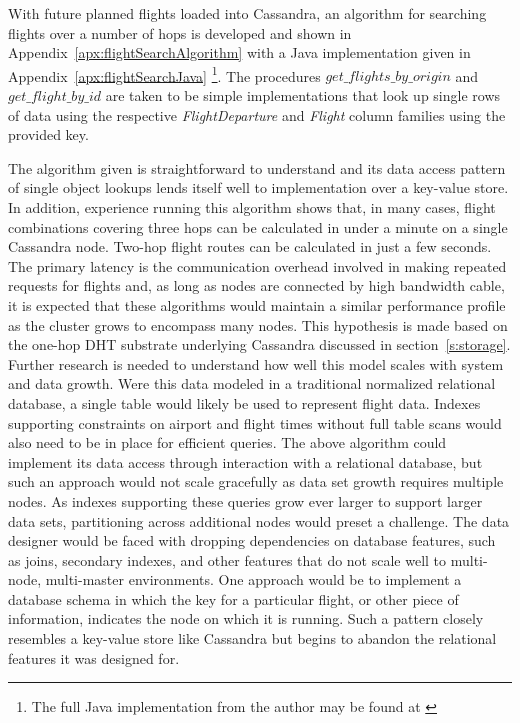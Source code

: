 \documentclass[twocolumn]{article}
\begin{document}
With future planned flights loaded into Cassandra, an algorithm for searching flights over a number of hops is developed and shown in Appendix~\ref{apx:flightSearchAlgorithm} with a Java implementation given in Appendix~\ref{apx:flightSearchJava} \footnote[1]{The full Java implementation from the author may be found at \cite{ref:dfsource}}.  The procedures $get\_flights\_by\_origin$ and $get\_flight\_by\_id$ are taken to be simple implementations that look up single rows of data using the respective \emph{FlightDeparture} and \emph{Flight} column families using the provided key.

The algorithm given is straightforward to understand and its data access pattern of single object lookups lends itself well to implementation over a key-value store.  In addition, experience running this algorithm shows that, in many cases, flight combinations covering three hops can be calculated in under a minute on a single Cassandra node.  Two-hop flight routes can be calculated in just a few seconds.  The primary latency is the communication overhead involved in making repeated requests for flights and, as long as nodes are connected by high bandwidth cable, it is expected that these algorithms would maintain a similar performance profile as the cluster grows to encompass many nodes.  This hypothesis is made based on the one-hop DHT substrate underlying Cassandra discussed in section~\ref{s:storage}.  Further research is needed to understand how well this model scales with system and data growth.  Were this data modeled in a traditional normalized relational database, a single table would likely be used to represent flight data. Indexes supporting constraints on airport and flight times without full table scans would also need to be in place for efficient queries.  The above algorithm could implement its data access through interaction with a relational database, but such an approach would not scale gracefully as data set growth requires multiple nodes.  As indexes supporting these queries grow ever larger to support larger data sets, partitioning across additional nodes would preset a challenge.  The data designer would be faced with dropping dependencies on database features, such as joins, secondary indexes, and other features that do not scale well to multi-node, multi-master environments.  One approach would be to implement a database schema in which the key for a particular flight, or other piece of information, indicates the node on which it is running.  Such a pattern closely resembles a key-value store like Cassandra but begins to abandon the relational features it was designed for.
\end{document}
